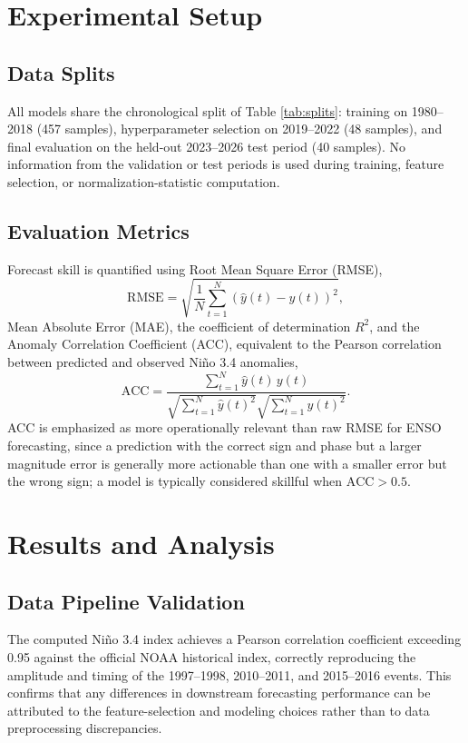 \documentclass[conference]{IEEEtran}
\begin{document}
\section{Experimental Setup}

\subsection{Data Splits}
All models share the chronological split of Table \ref{tab:splits}: training on 1980--2018 (457 samples), hyperparameter selection on 2019--2022 (48 samples), and final evaluation on the held-out 2023--2026 test period (40 samples). No information from the validation or test periods is used during training, feature selection, or normalization-statistic computation.

\subsection{Evaluation Metrics}
Forecast skill is quantified using Root Mean Square Error (RMSE),
\begin{equation}
\mathrm{RMSE} = \sqrt{\frac{1}{N}\sum_{t=1}^{N}(\hat{y}(t)-y(t))^2},
\label{eq:rmse}
\end{equation}
Mean Absolute Error (MAE), the coefficient of determination $R^2$, and the Anomaly Correlation Coefficient (ACC), equivalent to the Pearson correlation between predicted and observed Ni\~no 3.4 anomalies,
\begin{equation}
\mathrm{ACC} = \frac{\sum_{t=1}^{N}\hat{y}(t)\,y(t)}{\sqrt{\sum_{t=1}^{N}\hat{y}(t)^2}\sqrt{\sum_{t=1}^{N}y(t)^2}}.
\label{eq:acc}
\end{equation}
ACC is emphasized as more operationally relevant than raw RMSE for ENSO forecasting, since a prediction with the correct sign and phase but a larger magnitude error is generally more actionable than one with a smaller error but the wrong sign; a model is typically considered skillful when $\mathrm{ACC}>0.5$.

\section{Results and Analysis}

\subsection{Data Pipeline Validation}
The computed Ni\~no 3.4 index achieves a Pearson correlation coefficient exceeding 0.95 against the official NOAA historical index, correctly reproducing the amplitude and timing of the 1997--1998, 2010--2011, and 2015--2016 events. This confirms that any differences in downstream forecasting performance can be attributed to the feature-selection and modeling choices rather than to data preprocessing discrepancies.
\end{document}

